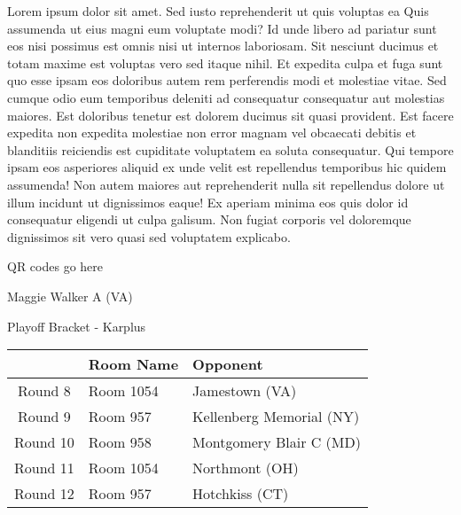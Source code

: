 \documentclass{article}%
\begin{document}
\vspace*{8pt}%
\linebreak%
\newline%
\newline%
Lorem ipsum dolor sit amet. Sed iusto reprehenderit ut quis voluptas ea Quis assumenda ut eius magni eum voluptate modi? Id unde libero ad pariatur sunt eos nisi possimus est omnis nisi ut internos laboriosam. Sit nesciunt ducimus et totam maxime est voluptas vero sed itaque nihil. Et expedita culpa et fuga sunt quo esse ipsam eos doloribus autem rem perferendis modi et molestiae vitae.\newline%
\newline%
Sed cumque odio eum temporibus deleniti ad consequatur consequatur aut molestias maiores. Est doloribus tenetur est dolorem ducimus sit quasi provident. Est facere expedita non expedita molestiae non error magnam vel obcaecati debitis et blanditiis reiciendis est cupiditate voluptatem ea soluta consequatur. Qui tempore ipsam eos asperiores aliquid ex unde velit est repellendus temporibus hic quidem assumenda!\newline%
\newline%
Non autem maiores aut reprehenderit nulla sit repellendus dolore ut illum incidunt ut dignissimos eaque! Ex aperiam minima eos quis dolor id consequatur eligendi ut culpa galisum. Non fugiat corporis vel doloremque dignissimos sit vero quasi sed voluptatem explicabo.\newline%
\newline%
%
\vspace*{30pt}%
\begin{center}%
\begin{Huge}%
QR codes go here%
\end{Huge}%
\end{center}%
\newpage%
\begin{center}%
\begin{Huge}%
Maggie Walker A (VA)%
\end{Huge}%
\vspace*{8pt}%
\linebreak%
\begin{Large}%
Playoff Bracket {-} Karplus%
\end{Large}%
\end{center}%
%
\begin{tabularx}{\textwidth}{|c|Y|Y|}%
\hline%
&Room Name&Opponent\\%
\hline%
Round 8&Room 1054&Jamestown (VA)\\%
Round 9&Room 957&Kellenberg Memorial (NY)\\%
Round 10&Room 958&Montgomery Blair C (MD)\\%
Round 11&Room 1054&Northmont (OH)\\%
Round 12&Room 957&Hotchkiss (CT)\\%
\hline%
\end{tabularx}%
\end{document}

